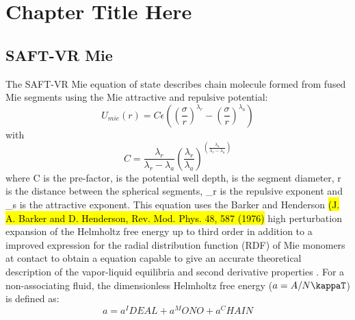 
\chapter{Chapter Title Here} %

\label{ChapterX} %


\section{SAFT-VR Mie}

The SAFT-VR Mie equation of state \cite{lafitte2013} describes chain molecule formed from fused Mie segments using the Mie attractive and repulsive potential: 
\begin{equation}
U_{mie}(r) = C\epsilon \left( \left(\frac{\sigma}{r} \right)^{\lambda_r} - \left(\frac{\sigma}{r} \right)^{\lambda_a} \right)
\label{eqn:miepotential}
\end{equation}
with
\begin{equation}
C = \frac{\lambda_r}{\lambda_r - \lambda_a} \left(\frac{\lambda_r}{\lambda_a} \right)^{\left( \frac{\lambda_a}{\lambda_r - \lambda_a} \right)}
\label{eqn:coefmie}
\end{equation}
where C is the pre-factor, \epsilon is the potential well depth, \sigma is the segment diameter, r is the distance between the spherical segments, \lambda_r is the repulsive exponent and \lambda_s is the attractive exponent. This equation uses the Barker and Henderson \cite{} \hl{(J. A. Barker and D. Henderson, Rev. Mod. Phys. 48, 587 (1976)} high perturbation expansion of the Helmholtz free energy up to third order in addition to a improved expression for the  radial distribution function (RDF) of Mie monomers at contact to obtain a equation capable to give an accurate theoretical description of the vapor-liquid equilibria and second derivative properties \cite{lafitte2013}. For a non-associating fluid, the dimensionless Helmholtz free energy ($a = A / N\kappaT$) is defined as:
\begin{equation}
a = a^IDEAL + a^MONO + a^CHAIN
\label{eqn:miehelm}
\end{equation}
